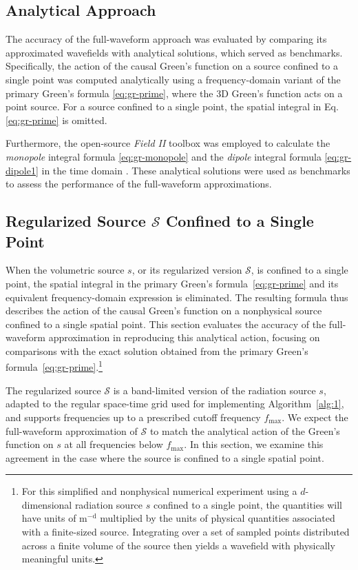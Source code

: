 \documentclass[11pt,reqno]{amsart}
\theoremstyle{remark}
\theoremstyle{italic_lemma}
\begin{document}
\subsection*{Analytical Approach}
The accuracy of the full-waveform approach was evaluated by comparing its approximated wavefields with analytical solutions, which served as benchmarks. Specifically, the action of the causal Green's function on a source confined to a single point was computed analytically using a frequency-domain variant of the primary Green's formula \eqref{eq:gr-prime}, where the 3D Green's function acts on a point source. For a source confined to a single point, the spatial integral in Eq. \eqref{eq:gr-prime} is omitted.

Furthermore, the open-source \textit{Field II} toolbox was employed to calculate the \textit{monopole} integral formula \eqref{eq:gr-monopole} and the \textit{dipole} integral formula \eqref{eq:gr-dipole1} in the time domain \cite{Jensen1,Jensen2}. These analytical solutions were used as benchmarks to assess the performance of the full-waveform approximations.

 \subsection{Regularized Source \( \mathcal{S} \) Confined to a Single Point}
\label{sec:num-s}

When the volumetric source \( s \), or its regularized version \( \mathcal{S} \), is confined to a single point, the spatial integral in the primary Green's formula~\eqref{eq:gr-prime} and its equivalent frequency-domain expression is eliminated. The resulting formula thus describes the action of the causal Green's function on a nonphysical source confined to a single spatial point. This section evaluates the accuracy of the full-waveform approximation in reproducing this analytical action, focusing on comparisons with the exact solution obtained from the primary Green's formula~\eqref{eq:gr-prime}.\footnote{For this simplified and nonphysical numerical experiment using a $d$-dimensional radiation source $s$ confined to a single point, the quantities will have units of $\text{m}^{-\text{d}}$ multiplied by the units of physical quantities associated with a finite-sized source. Integrating over a set of sampled points distributed across a finite volume of the source then yields a wavefield with physically meaningful units.}

The regularized source \( \mathcal{S} \) is a band-limited version of the radiation source \( s \), adapted to the regular space-time grid used for implementing Algorithm~\ref{alg:1}, and supports frequencies up to a prescribed cutoff frequency \( f_{\text{max}} \). We expect the full-waveform approximation of \( \mathcal{S} \) to match the analytical action of the Green's function on \( s \) at all frequencies below \( f_{\text{max}} \). In this section, we examine this agreement in the case where the source is confined to a single spatial point.
\end{document}
